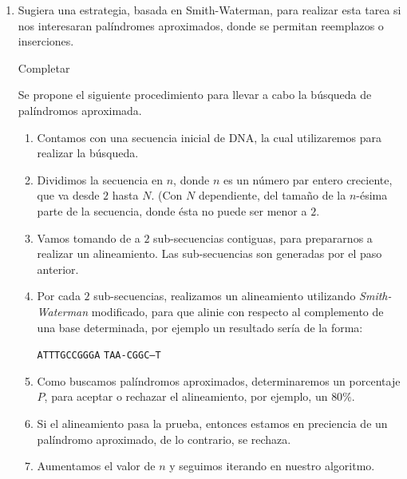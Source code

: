\begin{enumerate}
	\item Sugiera una estrategia, basada en Smith-Waterman, para realizar esta tarea si nos interesaran
		palíndromes aproximados, donde se permitan reemplazos o inserciones.


			 Completar

			Se propone el siguiente procedimiento para llevar a cabo la búsqueda
			de palíndromos aproximada.

			\begin{enumerate}
				\item Contamos con una secuencia inicial de DNA, la cual utilizaremos
					para realizar la búsqueda.
				\item Dividimos la secuencia en $n$, donde $n$ es un número par entero
					creciente, que va desde $2$ hasta $N$. (Con $N$ dependiente,
					del tamaño de la $n$-ésima parte de la secuencia, donde ésta
					no puede ser menor a $2$.
				\item Vamos tomando de a $2$ sub-secuencias contiguas, para prepararnos
					a realizar un alineamiento. Las sub-secuencias son generadas por el
					paso anterior.
				\item Por cada $2$ sub-secuencias, realizamos un alineamiento utilizando
					\emph{Smith-Waterman} modificado, para que alinie con respecto al
					complemento de una base determinada, por ejemplo un resultado sería
					de la forma:
					\begin{center}	
					\texttt{ATTTGCCGGGA}
					\texttt{TAA-CGGC--T}
					\end{center}	
				\item Como buscamos palíndromos aproximados, determinaremos un porcentaje
					$P$, para aceptar o rechazar el alineamiento, por ejemplo, un $80\%$. 
				\item Si el alineamiento pasa la prueba, entonces estamos en preciencia
					de un palíndromo aproximado, de lo contrario, se rechaza.
				\item Aumentamos el valor de $n$ y seguimos iterando en nuestro algoritmo.
			\end{enumerate}
			


\end{enumerate}
